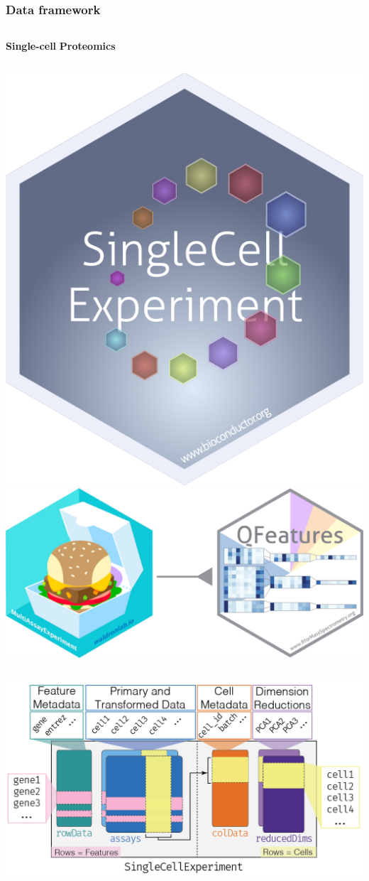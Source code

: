 \documentclass{beamer}
\begin{document}
\begin{frame}[allowframebreaks]
  \frametitle{Data framework}
  
  \vfill 
  \begin{columns}
    \centering
    \textbf{Single-cell}
    \centering
    \textbf{Proteomics}
  \end{columns}
  \vfill
  \begin{columns}
    \centering
    \includegraphics[width=0.3\linewidth]{figs/sticker_SCE.png}
    \centering
    \includegraphics[width=0.7\linewidth]{figs/sticker_MAE+QFeatures.png}
  \end{columns}
  \vfill
  \begin{columns}
    \centering
    \includegraphics[width=\linewidth]{figs/SingleCellExperiment.png}
    \centering

\end{columns}
\end{frame}
\end{document}
